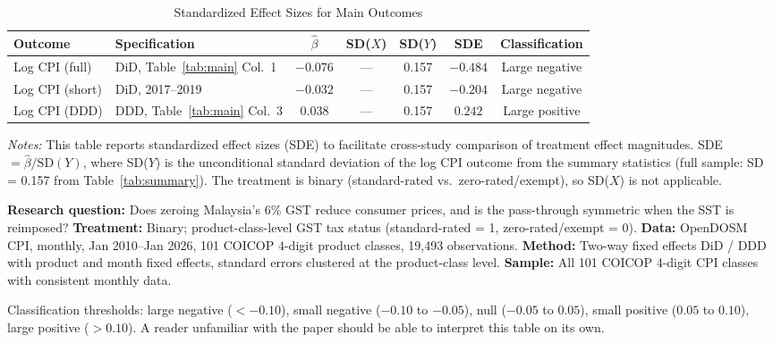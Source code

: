 \documentclass[12pt]{article}
\begin{document}
\begin{table}[H]
\centering
\caption{Standardized Effect Sizes for Main Outcomes}
\label{tab:sde}
\begin{adjustbox}{max width=\textwidth}
\begin{tabular}{llccccc}
\toprule
Outcome & Specification & $\hat{\beta}$ & SD($X$) & SD($Y$) & SDE & Classification \\
\midrule
Log CPI (full) & DiD, Table~\ref{tab:main} Col.\ 1 & $-0.076$ & --- & 0.157 & $-0.484$ & Large negative \\
Log CPI (short) & DiD, 2017--2019 & $-0.032$ & --- & 0.157 & $-0.204$ & Large negative \\
Log CPI (DDD) & DDD, Table~\ref{tab:main} Col.\ 3 & $0.038$ & --- & 0.157 & $0.242$ & Large positive \\
\bottomrule
\end{tabular}
\end{adjustbox}
\par\vspace{0.3em}
{\footnotesize \emph{Notes:} This table reports standardized effect sizes (SDE)
to facilitate cross-study comparison of treatment effect magnitudes.
SDE $= \hat{\beta} / \text{SD}(Y)$, where SD($Y$) is the unconditional standard deviation
of the log CPI outcome from the summary statistics (full sample: SD = 0.157 from Table~\ref{tab:summary}).
The treatment is binary (standard-rated vs.\ zero-rated/exempt), so SD($X$) is not applicable.

\textbf{Research question:} Does zeroing Malaysia's 6\% GST reduce consumer prices, and is the pass-through symmetric when the SST is reimposed?
\textbf{Treatment:} Binary; product-class-level GST tax status (standard-rated = 1, zero-rated/exempt = 0).
\textbf{Data:} OpenDOSM CPI, monthly, Jan 2010--Jan 2026, 101 COICOP 4-digit product classes, 19,493 observations.
\textbf{Method:} Two-way fixed effects DiD / DDD with product and month fixed effects, standard errors clustered at the product-class level.
\textbf{Sample:} All 101 COICOP 4-digit CPI classes with consistent monthly data.

Classification thresholds:
large negative ($< -0.10$), small negative ($-0.10$ to $-0.05$),
null ($-0.05$ to $0.05$), small positive ($0.05$ to $0.10$),
large positive ($> 0.10$).
A reader unfamiliar with the paper should be able to interpret this table
on its own.}
\end{table}
\end{document}
